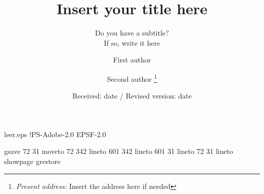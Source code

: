 %
%
%
%
\begin{filecontents}{leer.eps}
!PS-Adobe-2.0 EPSF-2.0

gsave
72 31 moveto
72 342 lineto
601 342 lineto
601 31 lineto
72 31 lineto
showpage
grestore
\end{filecontents}
%
\documentclass[epj]{svjour}
%
\usepackage{graphics}
%

%
\title{Insert your title here}
\subtitle{Do you have a subtitle?\\ If so, write it here}
\author{First author \and Second author%
\thanks{\emph{Present address:} Insert the address here if needed}%
}                     %
%
\offprints{}          %
%
%
\date{Received: date / Revised version: date}
%
%
\maketitle
%
\section{Introduction}
\label{intro}
Your text comes here in one column style. Separate text sections with
\section{Section title}
\label{sec:1}
and \cite{RefJ}
\subsection{Subsection title}
\label{sec:2}
as required. Don't forget to give each section
and subsection a unique label (see Sect.~\ref{sec:1}). You can also insert figures and tables.

